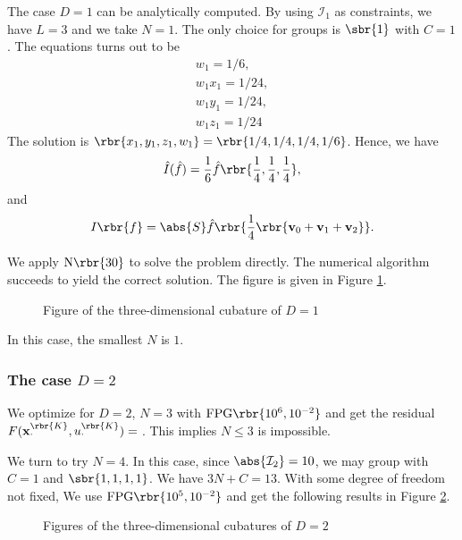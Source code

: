\documentclass[english, nochinese]{pnote}
\begin{document}
The case $ D = 1 $ can be analytically computed. By using $\mathcal{I}_1$ as constraints, we have $ L = 3 $ and we take $ N = 1 $. The only choice for groups is $\sbr{1}$ with $ C = 1 $. The equations turns out to be
\begin{gather}
w_1 = 1 / 6, \\
w_1 x_1 = 1 / 24, \\
w_1 y_1 = 1 / 24, \\
w_1 z_1 = 1 / 24
\end{gather}
The solution is $ \rbr{ x_1, y_1, z_1, w_1 } = \rbr{ 1 / 4, 1 / 4, 1 / 4, 1 / 6 } $. Hence, we have
\begin{equation}
\hat{I} (\hat{f}) = \frac{1}{6} \hat{f} \rbr{ \frac{1}{4}, \frac{1}{4}, \frac{1}{4} },
\end{equation}
and
\begin{equation}
I \rbr{f} = \abs{S} \hat{f} \rbr{ \frac{1}{4} \rbr{ \mathbf{v}_0 + \mathbf{v}_1 + \mathbf{v}_2 } }.
\end{equation}

We apply $ \text{N} \rbr{30} $ to solve the problem directly. The numerical algorithm succeeds to yield the correct solution. The figure is given in Figure \ref{Fig:M3D1}.

\begin{figure}[htbp]
\centering
\scalebox{0.75}{}
\caption{Figure of the three-dimensional cubature of $ D = 1 $}
\label{Fig:M3D1}
\end{figure}

In this case, the smallest $N$ is $1$.

\subsubsection{The case $ D = 2 $}

We optimize for $ D = 2 $, $ N = 3 $ with $ \text{FPG} \rbr{ 10^6, 10^{-2} } $ and get the residual $ F ( \mathbf{x}_{\cdot}^{\rbr{K}}, u_{\cdot}^{\rbr{K}} ) = \text{} $. This implies $ N \le 3 $ is impossible.

We turn to try $ N = 4 $. In this case, since $ \abs{\mathcal{I}_2} = 10 $, we may group with $ C = 1 $ and $ \sbr{ 1, 1, 1, 1 } $. We have $ 3 N + C = 13 $. With some degree of freedom not fixed, We use $ \text{FPG} \rbr{ 10^5, 10^{-2} } $ and get the following results in Figure \ref{Fig:M3D2Ran}.

\begin{figure}[htbp]
\centering
\scalebox{0.75}{}
\scalebox{0.75}{}
\scalebox{0.75}{}
\caption{Figures of the three-dimensional cubatures of $ D = 2 $}
\label{Fig:M3D2Ran}
\end{figure}
\end{document}
